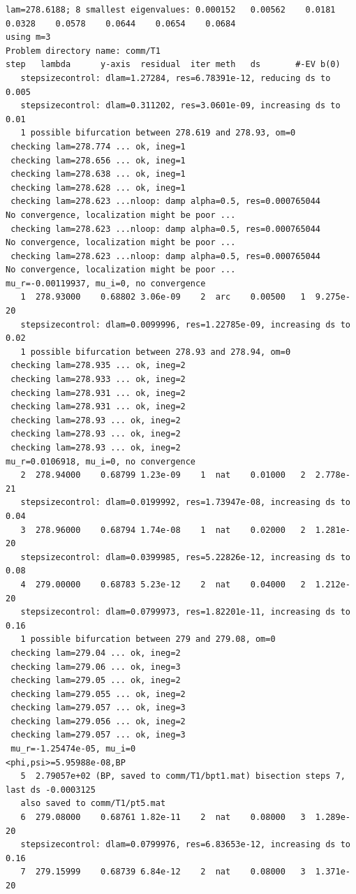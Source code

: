 \documentclass[a4paper,12pt]{article}
\begin{document}
\begin{verbatim}
lam=278.6188; 8 smallest eigenvalues: 0.000152   0.00562    0.0181    0.0328    0.0578    0.0644    0.0654    0.0684
using m=3
Problem directory name: comm/T1
step   lambda      y-axis  residual  iter meth   ds       #-EV b(0)       
   stepsizecontrol: dlam=1.27284, res=6.78391e-12, reducing ds to 0.005
   stepsizecontrol: dlam=0.311202, res=3.0601e-09, increasing ds to 0.01
   1 possible bifurcation between 278.619 and 278.93, om=0
 checking lam=278.774 ... ok, ineg=1
 checking lam=278.656 ... ok, ineg=1
 checking lam=278.638 ... ok, ineg=1
 checking lam=278.628 ... ok, ineg=1
 checking lam=278.623 ...nloop: damp alpha=0.5, res=0.000765044
No convergence, localization might be poor ...
 checking lam=278.623 ...nloop: damp alpha=0.5, res=0.000765044
No convergence, localization might be poor ...
 checking lam=278.623 ...nloop: damp alpha=0.5, res=0.000765044
No convergence, localization might be poor ...
mu_r=-0.00119937, mu_i=0, no convergence
   1  278.93000    0.68802 3.06e-09    2  arc    0.00500   1  9.275e-20 
   stepsizecontrol: dlam=0.0099996, res=1.22785e-09, increasing ds to 0.02
   1 possible bifurcation between 278.93 and 278.94, om=0
 checking lam=278.935 ... ok, ineg=2
 checking lam=278.933 ... ok, ineg=2
 checking lam=278.931 ... ok, ineg=2
 checking lam=278.931 ... ok, ineg=2
 checking lam=278.93 ... ok, ineg=2
 checking lam=278.93 ... ok, ineg=2
 checking lam=278.93 ... ok, ineg=2
mu_r=0.0106918, mu_i=0, no convergence
   2  278.94000    0.68799 1.23e-09    1  nat    0.01000   2  2.778e-21 
   stepsizecontrol: dlam=0.0199992, res=1.73947e-08, increasing ds to 0.04
   3  278.96000    0.68794 1.74e-08    1  nat    0.02000   2  1.281e-20 
   stepsizecontrol: dlam=0.0399985, res=5.22826e-12, increasing ds to 0.08
   4  279.00000    0.68783 5.23e-12    2  nat    0.04000   2  1.212e-20 
   stepsizecontrol: dlam=0.0799973, res=1.82201e-11, increasing ds to 0.16
   1 possible bifurcation between 279 and 279.08, om=0
 checking lam=279.04 ... ok, ineg=2
 checking lam=279.06 ... ok, ineg=3
 checking lam=279.05 ... ok, ineg=2
 checking lam=279.055 ... ok, ineg=2
 checking lam=279.057 ... ok, ineg=3
 checking lam=279.056 ... ok, ineg=2
 checking lam=279.057 ... ok, ineg=3
 mu_r=-1.25474e-05, mu_i=0 
<phi,psi>=5.95988e-08,BP
   5  2.79057e+02 (BP, saved to comm/T1/bpt1.mat) bisection steps 7, last ds -0.0003125
   also saved to comm/T1/pt5.mat
   6  279.08000    0.68761 1.82e-11    2  nat    0.08000   3  1.289e-20 
   stepsizecontrol: dlam=0.0799976, res=6.83653e-12, increasing ds to 0.16
   7  279.15999    0.68739 6.84e-12    2  nat    0.08000   3  1.371e-20 

\end{verbatim}
\end{document}
